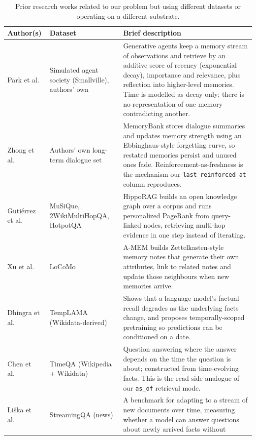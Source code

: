 \documentclass[11pt,a4paper]{article}
\begin{document}
\begin{table}[htbp]
\centering
\caption{Prior research works related to our problem but using different
datasets or operating on a different substrate.}
\label{tab:diff}
\small
\begin{tabularx}{\textwidth}{p{2.6cm} p{3.2cm} X}
\toprule
\textbf{Author(s)} & \textbf{Dataset} & \textbf{Brief description}\\
\midrule
Park et al.~\cite{park2023generativeagents} &
Simulated agent society (Smallville), authors' own &
Generative agents keep a memory stream of observations and retrieve by an
additive score of recency (exponential decay), importance and relevance, plus
reflection into higher-level memories. Time is modelled as decay only; there is
no representation of one memory contradicting another.\\
\addlinespace
Zhong et al.~\cite{zhong2023memorybank} &
Authors' own long-term dialogue set &
MemoryBank stores dialogue summaries and updates memory strength using an
Ebbinghaus-style forgetting curve, so restated memories persist and unused ones
fade. Reinforcement-as-freshness is the mechanism our
\texttt{last\_reinforced\_at} column reproduces.\\
\addlinespace
Guti\'errez et al.~\cite{gutierrez2024hipporag} &
MuSiQue, 2WikiMultiHopQA, HotpotQA &
HippoRAG builds an open knowledge graph over a corpus and runs personalized
PageRank from query-linked nodes, retrieving multi-hop evidence in one step
instead of iterating.\\
\addlinespace
Xu et al.~\cite{xu2025amem} & LoCoMo &
A-MEM builds Zettelkasten-style memory notes that generate their own
attributes, link to related notes and update those neighbours when new memories
arrive.\\
\addlinespace
Dhingra et al.~\cite{dhingra2022templama} & TempLAMA (Wikidata-derived) &
Shows that a language model's factual recall degrades as the underlying facts
change, and proposes temporally-scoped pretraining so predictions can be
conditioned on a date.\\
\addlinespace
Chen et al.~\cite{chen2021timeqa} & TimeQA (Wikipedia + Wikidata) &
Question answering where the answer depends on the time the question is about;
constructed from time-evolving facts. This is the read-side analogue of our
\texttt{as\_of} retrieval mode.\\
\addlinespace
Li\v{s}ka et al.~\cite{liska2022streamingqa} & StreamingQA (news) &
A benchmark for adapting to a stream of new documents over time, measuring
whether a model can answer questions about newly arrived facts without

\end{tabularx}
\end{table}
\end{document}
